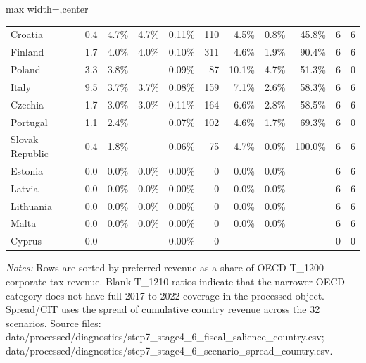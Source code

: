 \begin{table}[H]
\begin{adjustbox}{max width=\textwidth,center}
\begin{tabular}{@{}lrrrrrrrrrr@{}}
Croatia &  0.4 &   4.7\% &   4.7\% &  0.11\% &    110 &   4.5\% &  0.8\% &  45.8\% & 6 & 6 \\
Finland &  1.7 &   4.0\% &   4.0\% &  0.10\% &    311 &   4.6\% &  1.9\% &  90.4\% & 6 & 6 \\
Poland &  3.3 &   3.8\% &  &  0.09\% &     87 &  10.1\% &  4.7\% &  51.3\% & 6 & 0 \\
Italy &  9.5 &   3.7\% &   3.7\% &  0.08\% &    159 &   7.1\% &  2.6\% &  58.3\% & 6 & 6 \\
Czechia &  1.7 &   3.0\% &   3.0\% &  0.11\% &    164 &   6.6\% &  2.8\% &  58.5\% & 6 & 6 \\
Portugal &  1.1 &   2.4\% &  &  0.07\% &    102 &   4.6\% &  1.7\% &  69.3\% & 6 & 0 \\
Slovak Republic &  0.4 &   1.8\% &  &  0.06\% &     75 &   4.7\% &  0.0\% & 100.0\% & 6 & 6 \\
Estonia &  0.0 &   0.0\% &   0.0\% &  0.00\% &      0 &   0.0\% &  0.0\% &  & 6 & 6 \\
Latvia &  0.0 &   0.0\% &   0.0\% &  0.00\% &      0 &   0.0\% &  0.0\% &  & 6 & 6 \\
Lithuania &  0.0 &   0.0\% &   0.0\% &  0.00\% &      0 &   0.0\% &  0.0\% &  & 6 & 6 \\
Malta &  0.0 &   0.0\% &   0.0\% &  0.00\% &      0 &   0.0\% &  0.0\% &  & 6 & 6 \\
Cyprus &  0.0 &  &  &  0.00\% &      0 &  &  &  & 0 & 0 \\
\bottomrule
\end{tabular}
\end{adjustbox}

\vspace{0.5em}
\begin{minipage}{0.96\textwidth}
\footnotesize\raggedright \textit{Notes:} Rows are sorted by preferred revenue as a share of OECD T\_1200 corporate tax revenue. Blank T\_1210 ratios indicate that the narrower OECD category does not have full 2017 to 2022 coverage in the processed object. Spread/CIT uses the spread of cumulative country revenue across the 32 scenarios. Source files: data/processed/diagnostics/step7\_stage4\_6\_fiscal\_salience\_country.csv; data/processed/diagnostics/step7\_stage4\_6\_scenario\_spread\_country.csv.
\end{minipage}
\end{table}
